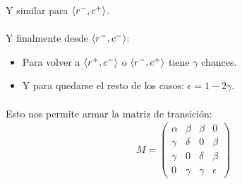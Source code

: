 \documentclass[../main.tex]{subfiles}
\begin{document}
Y similar para \(\langle r^{-}, c^{+} \rangle\).

\begin{figure}[H]
  \centering
\end{figure}

\paragraph{} Y finalmente desde \(\langle r^{-}, c^{-} \rangle\):
\begin{itemize}
  \item Para volver a \(\langle r^{+}, c^{-} \rangle\) o \(\langle r^{-}, c^{+} \rangle\) tiene \(\gamma\) chances.
  \item Y para quedarse el resto de los casos: \(\epsilon = 1 - 2\gamma\).
\end{itemize}

\begin{figure}[H]
 \centering
\end{figure}

\paragraph{} Esto nos permite armar la matriz de transición:
\begin{gather*}
  M = \begin{pmatrix}
    \alpha & \beta & \beta & 0 \\
    \gamma & \delta & 0 & \beta \\
    \gamma & 0 & \delta & \beta \\
    0 & \gamma & \gamma & \epsilon
  \end{pmatrix}
\end{gather*}
\end{document}
